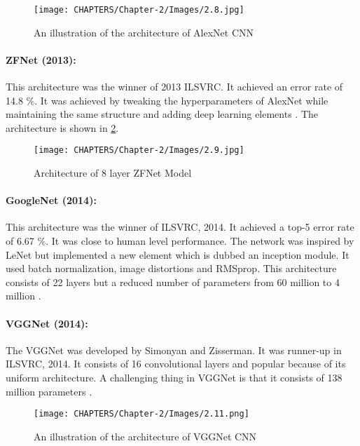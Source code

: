 
\begin{figure}[H]
	\centering
	\captionsetup{justification=centering,margin=2cm}
	\texttt{[image: CHAPTERS/Chapter-2/Images/2.8.jpg]}
	\caption{An illustration of the architecture of AlexNet CNN}
	\label{fig:2.8}
\end{figure}

\paragraph*{ZFNet (2013):}
This architecture was the winner of 2013 ILSVRC. It achieved 
an error rate of 14.8 \%. It was achieved by tweaking the 
hyperparameters of AlexNet while maintaining the same structure and 
adding deep learning elements \cite{chap_2_article:11}. The architecture 
is shown in \ref{fig:2.9}.

\begin{figure}[H]
	\centering
	\captionsetup{justification=centering,margin=2cm}
	\texttt{[image: CHAPTERS/Chapter-2/Images/2.9.jpg]}
	\caption{Architecture of 8 layer ZFNet Model}
	\label{fig:2.9}
\end{figure}

\paragraph*{GoogleNet (2014):}
This architecture was the winner of  ILSVRC, 2014. It achieved a top-5 
error rate of 6.67 \%. It was close to human level performance. The network 
was inspired by LeNet but implemented a new element which is dubbed an 
inception module. It used batch normalization, image distortions and RMSprop. This architecture consists of 22 layers but a 
reduced number of parameters from 60 million to 4 million \cite{chap_2_article:12}. 

\paragraph*{VGGNet (2014):}
The VGGNet was developed by Simonyan and Zisserman. It was 
runner-up in ILSVRC, 2014. It consists of 16 convolutional 
layers and popular because of its uniform architecture. A challenging thing in 
VGGNet is that it consists of 138 million parameters \cite{chap_2_article:13}.
\begin{figure}[H]
	\centering
	\captionsetup{justification=centering,margin=2cm}
	\texttt{[image: CHAPTERS/Chapter-2/Images/2.11.png]}
	\caption{An illustration of the architecture of VGGNet CNN}
	\label{fig:2.10}
\end{figure}

